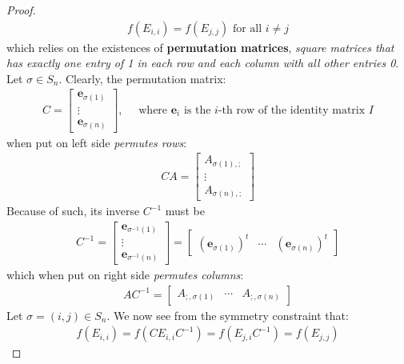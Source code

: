 \documentclass{report}
\begin{document}
\begin{proof}
\begin{align*}
f(E_{i,i})=f(E_{j,j})\text{ for all }i\neq j
\end{align*}
which relies on the existences of \textbf{permutation matrices}, \emph{square matrices that has exactly one entry of 1 in each row and each column with all other entries 0}. Let $\sigma \in S_n$. Clearly, the permutation matrix:  
\begin{align*}
C=\begin{bmatrix}
\textbf{e}_{\sigma (1)} \\
\vdots \\
\textbf{e}_{\sigma (n)}
\end{bmatrix},\quad \text{ where  $\textbf{e}_i$ is the $i$-th row of the identity matrix $I$}
\end{align*}
when put on left side \emph{permutes rows}: 
\begin{align*}
CA= \begin{bmatrix}
A_{\sigma (1),;} \\
\vdots \\
A_{\sigma (n),;}
\end{bmatrix} 
\end{align*}
Because of such, its inverse $C^{-1}$ must be 
\begin{align*}
C^{-1}= \begin{bmatrix}
\textbf{e}_{\sigma^{-1}(1)}\\
\vdots \\
\textbf{e}_{\sigma^{-1}(n)}
\end{bmatrix}  = \begin{bmatrix}
(\textbf{e}_{\sigma (1)})^t & \cdots & (\textbf{e}_{\sigma (n)})^t
\end{bmatrix}
\end{align*}
which when put on right side \emph{permutes columns}: 
\begin{align*}
AC^{-1}= \begin{bmatrix}
  A_{;,\sigma (1)} & \cdots & A_{;,\sigma (n)}
\end{bmatrix}
\end{align*}
Let $\sigma = (i,j)\in S_n$. We now see from the symmetry constraint that:  
\begin{align*}
f(E_{i,i})=f(CE_{i,i}C^{-1})= f(E_{j,i}C^{-1})= f(E_{j,j}) 
\end{align*}

\end{proof}
\end{document}
